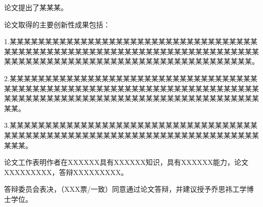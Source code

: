 \fancyfoot[LE,RO]{}




论文提出了某某某。

论文取得的主要创新性成果包括：

1.某某某某某某某某某某某某某某某某某某某某某某某某某某某某某某某某某某某某某某某某某某某某某某某某某某某某某某某某某某某某某某某某某某某某某某某某某某某某某某某某某某某某某某某某某某某某某某某某某某某某某某某某某某。

2.某某某某某某某某某某某某某某某某某某某某某某某某某某某某某某某某某某某某某某某某某某某某某某某某某某某某某某某某某某某某某某某某某某某某某某某某某某某某某某某某某某某某某某某某某某某某某某某某某某某某某某某某某某某某某。

3.某某某某某某某某某某某某某某某某某某某某某某某某某某某某某某某某某某某某某某某某某某某某某某某某某某某某某某某某某某某某某某某某某某某某某某某某某某。

论文工作表明作者在XXXXXX具有XXXXXX知识，具有XXXXXX能力，论文XXXXXXXXX，答辩XXXXXXXXX。

答辩委员会表决，（XXX票/一致）同意通过论文答辩，并建议授予乔思祎工学博士学位。


%


